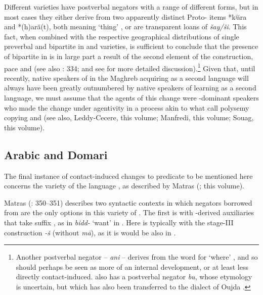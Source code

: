 \documentclass[output=paper]{langsci/langscibook}
\begin{document}
{Different  varieties have postverbal negators with a range of different forms, but in most cases they either derive from two apparently distinct Proto- items *kʲăra and *(h)ară(t), both meaning ‘thing’ \citep[332]{Kossmann2013book}, or are transparent loans of  \textit{šay/ši}. This fact, when combined with the respective geographical distributions of single preverbal and bipartite  in  and  varieties, is sufficient to conclude that the presence of bipartite  in  is in large part a result of  the second element of the  construction, pace \citet{Brugnatelli1987} and \citet{Lafkioui2013reinventing} (see also \citealt{Kossmann2013book}: 334; and see \citealt{Lucas2007,Lucas2009} for more detailed discussion).\footnote{Another postverbal negator –  \textit{ani} – derives from the word for ‘where’ \citep{Rabhi1992}, and so should perhaps be seen as more of an internal development, or at least less directly contact-induced.  also has a postverbal negator \textit{bu}, whose etymology is uncertain, but which has also been transferred to the   dialect of Oujda \citep{Lafkioui2013bu}.} Given that, until recently, native speakers of  in the Maghreb acquiring  as a second language will always have been greatly outnumbered by native speakers of  learning  as a second language, we must assume that the agents of this change were -dominant speakers who made the change under  agentivity in a process akin to what \citet{HeineKuteva2005} call polysemy copying and  (see also, Leddy-Cecere, this volume; Manfredi, this volume; Souag, this volume).}


\subsection{Arabic and Domari}


The final instance of contact-induced changes to predicate  to be mentioned here concerns the  variety of the  language , as described by Matras (\citeyear{Matras1999,Matras2007Domari,Matras2012}; this volume).

Matras (\citeyear{Matras2012}: 350–351) describes two syntactic contexts in which negators borrowed from   are the only options in this variety of . The first is with -derived  auxiliaries that take  suffix , as in \textit{bidd-} ‘want’ in . Here  is typically with the   stage-III construction \textit{{}-š} (without \textit{mā}), as it is would be also in  .
\end{document}

